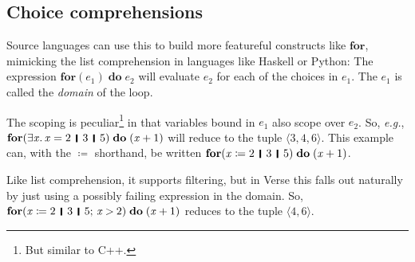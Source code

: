 \documentclass[acmsmall,review,dvipsnames]{acmart}
\newcommand{\Varid}[1]{\mathit{#1}}
\newcommand{\eg}{\emph{e.g.}}
\begin{document}
\subsection{Choice comprehensions} \label{sec:for}

Source languages can use this to build more featureful constructs like \ensuremath{\textbf{for}},
mimicking the list comprehension in languages like Haskell or Python:
The expression \ensuremath{\textbf{for} (\Varid{e}_{\mathrm{1}})\;\textbf{do}\;\Varid{e}_{\mathrm{2}}} will evaluate \ensuremath{\Varid{e}_{\mathrm{2}}} for each of the choices in \ensuremath{\Varid{e}_{\mathrm{1}}}.
The \ensuremath{\Varid{e}_{\mathrm{1}}} is called the \emph{domain} of the loop.

The scoping is peculiar\footnote{But similar to C++.}
in that variables bound in \ensuremath{\Varid{e}_{\mathrm{1}}} also scope over \ensuremath{\Varid{e}_{\mathrm{2}}}.
So, {\eg}, \ensuremath{\textbf{for} (\exists\Varid{x}.\,\Varid{x}\mathrel{=}\mathrm{2}\hspace{1mm}\mathop{\rule[-0.3mm]{0.5mm}{2.5mm}}\hspace{1mm}\mathrm{3}\hspace{1mm}\mathop{\rule[-0.3mm]{0.5mm}{2.5mm}}\hspace{1mm}\mathrm{5})\;\textbf{do}\;(\Varid{x}\mathbin{+}\mathrm{1})} will reduce to the tuple \ensuremath{\langle{}\mathrm{3},\mathrm{4},\mathrm{6}\rangle}.
This example can, with the \ensuremath{\mathrel{\coloneqq}} shorthand, be written \ensuremath{\textbf{for} (\Varid{x}\mathrel{\coloneqq}\mathrm{2}\hspace{1mm}\mathop{\rule[-0.3mm]{0.5mm}{2.5mm}}\hspace{1mm}\mathrm{3}\hspace{1mm}\mathop{\rule[-0.3mm]{0.5mm}{2.5mm}}\hspace{1mm}\mathrm{5})\;\textbf{do}\;(\Varid{x}\mathbin{+}\mathrm{1})}.

Like list comprehension, it supports filtering, but in Verse this falls out naturally by just using
a possibly failing expression in the domain.
So, \ensuremath{\textbf{for} (\Varid{x}\mathrel{\coloneqq}\mathrm{2}\hspace{1mm}\mathop{\rule[-0.3mm]{0.5mm}{2.5mm}}\hspace{1mm}\mathrm{3}\hspace{1mm}\mathop{\rule[-0.3mm]{0.5mm}{2.5mm}}\hspace{1mm}\mathrm{5};\,\Varid{x}\mathbin{>}\mathrm{2})\;\textbf{do}\;(\Varid{x}\mathbin{+}\mathrm{1})} reduces to the tuple \ensuremath{\langle{}\mathrm{4},\mathrm{6}\rangle}.
\end{document}
